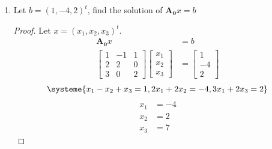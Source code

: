 \documentclass[11pt]{scrartcl}
\begin{document}
\begin{enumerate}[label=\alph*.]
{\begin{proof}
\begin{align*}
\begin{array}{@{}ccc|ccc@{}}
					      0 & 4 & 0       & -8       & -2       & 4  \\
					      0 & 0 & \frac12 & -\frac32 & -\frac34 & 1
				      \end{array}\right]                                    \\
			      R_2 \leftarrow \frac14 R_2 \quad R_3 \leftarrow 2R_3                  & =
			      \left[\begin{array}{@{}ccc|ccc@{}}
					      1 & 0 & 0 & 2  & 1        & -1 \\
					      0 & 1 & 0 & -2 & -\frac12 & 1  \\
					      0 & 0 & 1 & -3 & -\frac32 & 2
				      \end{array}\right]
		      \end{align*}
		      Therefore,
		      $$
			      \mathbf{A}_{\mathbf{0}}^{-1} =
			      \begin{bmatrix}
				      2  & 1        & -1 \\
				      -2 & -\frac12 & 1  \\
				      -3 & -\frac32 & 2
			      \end{bmatrix}
		      $$
	      \end{proof}
	      }
	\item{
	      Let $b = (1, -4, 2)^t$, find the solution of $\mathbf{A}_{\mathbf{0}} x = b$

	      \begin{proof}
		      Let $x = (x_1, x_2, x_3)^t$.
		      \begin{align*}
			      \mathbf{A}_{\mathbf{0}} x & = b \\
			      \begin{bmatrix}
				      1 & -1 & 1 \\
				      2 & 2  & 0 \\
				      3 & 0  & 2
			      \end{bmatrix}
			      \begin{bmatrix}
				      x_1 \\ x_2\\ x_3
			      \end{bmatrix}
			                                & =
			      \begin{bmatrix}
				      1 \\ -4 \\ 2
			      \end{bmatrix}
		      \end{align*}
		      $$\systeme{
				      x_1 - x_2 + x_3 = 1,
				      2x_1 + 2x_2 = -4,
				      3x_1 +2x_3 = 2
			      }$$
		      \begin{align*}
			      x_1 & = -4 \\
			      x_2 & = 2  \\
			      x_3 & = 7
		      \end{align*}
	      \end{proof}

}
\end{enumerate}
\end{document}
